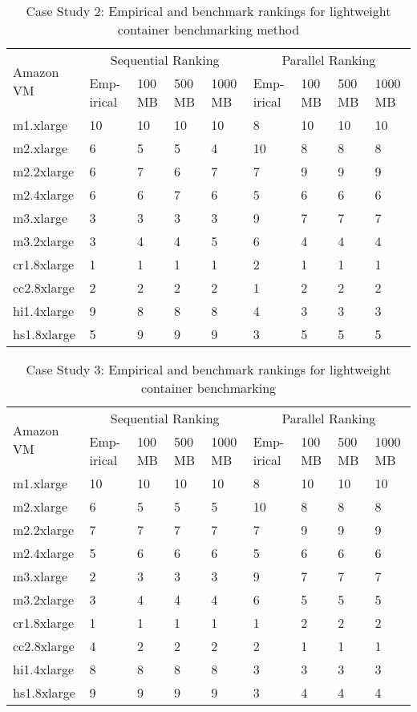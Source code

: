 \begin{table}[h]
\centering
\begin{tabular}{ |p{1.4cm}|p{0.4cm}|p{0.4cm}|p{0.4cm}|p{0.4cm}|p{0.4cm}|p{0.4cm}|p{0.4cm}|p{0.4cm}|  }
\hline
\multirow{2}{*}{Amazon VM} & \multicolumn{4}{|c|}{Sequential Ranking} &
\multicolumn{4}{|c|}{Parallel Ranking}\\ \cline{2-9}
& Emp-irical & 100 MB & 500 MB & 1000 MB & Emp-irical & 100 MB & 500 MB & 1000 MB \\
\hline
\hline
m1.xlarge 	&	10	&	10	&	10	&	10	&	8	&	10	&	10	&	10\\
m2.xlarge 	&	6	&	5	&	5	&	4	&	10	&	8	&	8	&	8\\
m2.2xlarge 	&	6	&	7	&	6	&	7	&	7	&	9	&	9	&	9\\
m2.4xlarge 	&	6	&	6	&	7	&	6	&	5	&	6	&	6	&	6\\
m3.xlarge 	&	3	&	3	&	3	&	3	&	9	&	7	&	7	&	7\\
m3.2xlarge 	&	3	&	4	&	4	&	5	&	6	&	4	&	4	&	4\\
cr1.8xlarge 	&	1	&	1	&	1	&	1	&	2	&	1	&	1	&	1\\
cc2.8xlarge 	&	2	&	2	&	2	&	2	&	1	&	2	&	2	&	2\\
hi1.4xlarge 	&	9	&	8	&	8	&	8	&	4	&	3	&	3	&	3\\
hs1.8xlarge 	&	5	&	9	&	9	&	9	&	3	&	5	&	5	&	5\\
\hline
\end{tabular}
\caption{Case Study 2: Empirical and benchmark rankings for lightweight container benchmarking method}
\label{table2-2}
\end{table}

\begin{table}[h]
\centering
\begin{tabular}{ |p{1.4cm}|p{0.4cm}|p{0.4cm}|p{0.4cm}|p{0.4cm}|p{0.4cm}|p{0.4cm}|p{0.4cm}|p{0.4cm}|  }
\hline
\multirow{2}{*}{Amazon VM} & \multicolumn{4}{|c|}{Sequential Ranking} &
\multicolumn{4}{|c|}{Parallel Ranking}\\ \cline{2-9}
& Emp-irical & 100 MB & 500 MB & 1000 MB & Emp-irical & 100 MB & 500 MB & 1000 MB \\
\hline
\hline
m1.xlarge 	&	10	&	10	&	10	&	10	&	8	&	10	&	10	&	10\\
m2.xlarge 	&	6	&	5	&	5	&	5	&	10	&	8	&	8	&	8\\
m2.2xlarge 	&	7	&	7	&	7	&	7	&	7	&	9	&	9	&	9\\
m2.4xlarge 	&	5	&	6	&	6	&	6	&	5	&	6	&	6	&	6\\
m3.xlarge 	&	2	&	3	&	3	&	3	&	9	&	7	&	7	&	7\\
m3.2xlarge 	&	3	&	4	&	4	&	4	&	6	&	5	&	5	&	5\\
cr1.8xlarge 	&	1	&	1	&	1	&	1	&	1	&	2	&	2	&	2\\
cc2.8xlarge 	&	4	&	2	&	2	&	2	&	2	&	1	&	1	&	1\\
hi1.4xlarge 	&	8	&	8	&	8	&	8	&	3	&	3	&	3	&	3\\
hs1.8xlarge 	&	9	&	9	&	9	&	9	&	3	&	4	&	4	&	4\\
\hline
\end{tabular}
\caption{Case Study 3: Empirical and benchmark rankings for lightweight container benchmarking}
\label{table2-3}
\end{table}

